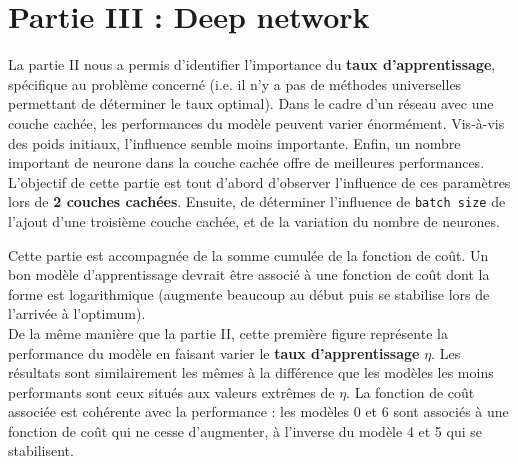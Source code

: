 \documentclass[a4paper]{article}
\newcommand{\code}[2]{\colorbox{light-gray}{\texttt{#1}}}
\begin{document}
		
	\section*{Partie III : Deep network}
	
	La partie II nous a permis d'identifier l'importance du \textbf{taux d'apprentissage}, spécifique au problème concerné (i.e. il n'y a pas de méthodes universelles permettant de déterminer le taux optimal). Dans le cadre d'un réseau avec une couche cachée, les performances du modèle peuvent varier énormément. Vis-à-vis des poids initiaux, l'influence semble moins importante. Enfin, un nombre important de neurone dans la couche cachée offre de meilleures performances.\\
	
	L'objectif de cette partie est tout d'abord d'observer l'influence de ces paramètres lors de \textbf{2 couches cachées}. Ensuite, de déterminer l'influence de \code{batch size}, de l'ajout d'une troisième couche cachée, et de la variation du nombre de neurones.
	
	Cette partie est accompagnée de la somme cumulée de la fonction de coût. Un bon modèle d'apprentissage devrait être associé à une fonction de coût dont la forme est logarithmique (augmente beaucoup au début puis se stabilise lors de l'arrivée à l'optimum).\\
	
	De la même manière que la partie II, cette première figure représente la performance du modèle en faisant varier le \textbf{taux d'apprentissage} $\eta$. Les résultats sont similairement les mêmes à la différence que les modèles les moins performants sont ceux situés aux valeurs extrêmes de $\eta$. La fonction de coût associée est cohérente avec la performance : les modèles 0 et 6 sont associés à une fonction de coût qui ne cesse d'augmenter, à l'inverse du modèle 4 et 5 qui se stabilisent.\\
\end{document}
